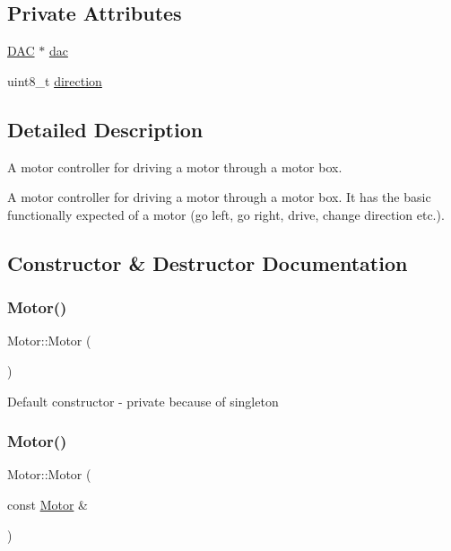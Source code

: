 \subsection*{Private Attributes}
\begin{DoxyCompactItemize}
\item 
\hyperlink{class_d_a_c}{D\+AC} $\ast$ \hyperlink{class_motor_ab8662062a02d2177b7694d5ab6ac6851}{dac}
\item 
uint8\+\_\+t \hyperlink{class_motor_a717a5684a774d01f46c8ae7145158279}{direction}
\end{DoxyCompactItemize}


\subsection{Detailed Description}
A motor controller for driving a motor through a motor box. 

A motor controller for driving a motor through a motor box. It has the basic functionally expected of a motor (go left, go right, drive, change direction etc.). 

\subsection{Constructor \& Destructor Documentation}
\hypertarget{class_motor_af6106b4c506411265c5face762b6c004}{}\label{class_motor_af6106b4c506411265c5face762b6c004} 
\subsubsection{\texorpdfstring{Motor()}{Motor()}\hspace{0.1cm}{\footnotesize\ttfamily [1/2]}}
{\footnotesize\ttfamily Motor\+::\+Motor (\begin{DoxyParamCaption}{ }\end{DoxyParamCaption})\hspace{0.3cm}{\ttfamily [private]}}

Default constructor -\/ private because of singleton \hypertarget{class_motor_a52b11cfa6ffdd07dcb26c71a017142a1}{}\label{class_motor_a52b11cfa6ffdd07dcb26c71a017142a1} 
\subsubsection{\texorpdfstring{Motor()}{Motor()}\hspace{0.1cm}{\footnotesize\ttfamily [2/2]}}
{\footnotesize\ttfamily Motor\+::\+Motor (\begin{DoxyParamCaption}\item[{const \hyperlink{class_motor}{Motor} \&}]{ }\end{DoxyParamCaption})\hspace{0.3cm}{\ttfamily [delete]}}


